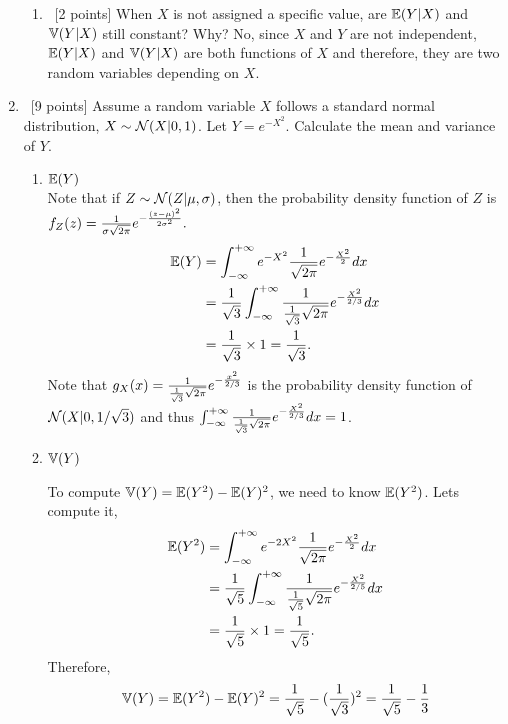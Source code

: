 \documentclass[12pt, fullpage,letterpaper]{article}
\def\blackblue{\color{black!40!blue}}
\begin{document}
\begin{enumerate}
\begin{enumerate}
            \item~[2 points] When $X$ is not assigned a specific value, are $\mathbb{E}(Y|X)$ and $\mathbb{V}(Y|X)$ still constant? Why?
            {\blackblue  
             \noindent No, since $X$ and $Y$ are not independent, $\mathbb{E}(Y|X)$ and $\mathbb{V}(Y|X)$ are both functions of $X$ and therefore, they are two random variables depending on $X$. 
            }
            
        \end{enumerate}
\item~[9 points] Assume a random variable $X$ follows a standard normal distribution, \ie $X \sim \mathcal{N}(X|0, 1)$. Let $Y = e^{-X^2}$. Calculate the mean and variance of $Y$.
\begin{enumerate}
	\item $\mathbb{E}(Y)$\\
	{\blackblue  
	Note that if $Z \sim \mathcal{N}(Z|\mu, \sigma)$, then the probability density function of $Z$ is 
	$f_Z(z) = {1\over \sigma\sqrt{2\pi}}e^{-{(z-\mu)^2\over 2\sigma^2}}.$
	\begin{align*}
	\mathbb{E}(Y) 
	& = \int_{-\infty}^{+\infty}e^{-X^2}{1\over \sqrt{2\pi}}e^{-{X^2\over 2}}dx\\
	& = {1\over \sqrt{3}}\int_{-\infty}^{+\infty}{1\over {1\over \sqrt{3}}\sqrt{2\pi}}e^{-{X^2\over 2/3}}dx\\
	& = {1\over \sqrt{3}}\times 1 = {1\over \sqrt{3}}.
	\end{align*}
	Note that $g_X(x) = {1\over {1\over \sqrt{3}}\sqrt{2\pi}}e^{-{x^2\over 2/3}}$ is the probability density function of  $\mathcal{N}(X|0, 1/\sqrt{3})$ and thus $\int_{-\infty}^{+\infty}{1\over {1\over \sqrt{3}}\sqrt{2\pi}}e^{-{X^2\over 2/3}}dx =1 $.
	}
	
	\item $\mathbb{V}(Y)$\\
	{\blackblue To compute $\mathbb{V}(Y)= \mathbb{E}(Y^2) - \mathbb{E}(Y)^2$, we need to know $\mathbb{E}(Y^2)$. Lets compute it,
	\begin{align*}
	\mathbb{E}(Y^2) 
	& = \int_{-\infty}^{+\infty}e^{-2X^2}{1\over \sqrt{2\pi}}e^{-{X^2\over 2}}dx\\
	& = {1\over \sqrt{5}}\int_{-\infty}^{+\infty}{1\over {1\over \sqrt{5}}\sqrt{2\pi}}e^{-{X^2\over 2/5}}dx\\
	& = {1\over \sqrt{5}}\times 1 = {1\over \sqrt{5}}.
	\end{align*}
	Therefore, 
	$$\mathbb{V}(Y) = \mathbb{E}(Y^2) - \mathbb{E}(Y)^2 = {1\over \sqrt{5}} -({1\over \sqrt{3}})^2 = {1\over \sqrt{5}} - {1\over 3}$$

}
\end{enumerate}
\end{enumerate}
\end{document}
